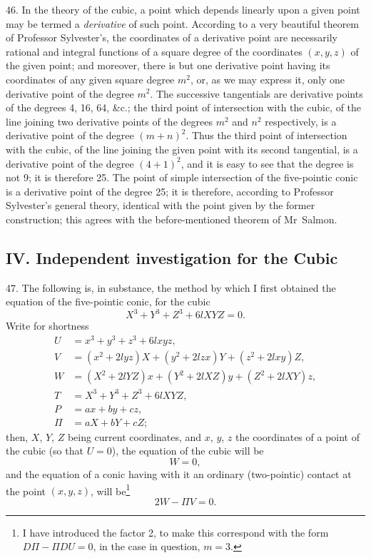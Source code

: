\documentclass[11pt,a4paper]{book}
\begin{document}
46. In the theory of the cubic, a point which depends linearly upon a given point may be termed a \textit{derivative} of such point. According to a very beautiful theorem of Professor Sylvester's, the coordinates of a derivative point are necessarily rational and integral functions of a square degree of the coordinates $(x,y,z)$ of the given point; and moreover, there is but one derivative point having its coordinates of any given square degree $m^2$, or, as we may express it, only one derivative point of the degree $m^2$. The successive tangentials are derivative points of the degrees 4, 16, 64, \&c.; the third point of intersection with the cubic, of the line joining two derivative points of the degrees $m^2$ and $n^2$ respectively, is a derivative point of the degree $(m+n)^2$. Thus the third point of intersection with the cubic, of the line joining the given point with its second tangential, is a derivative point of the degree $(4+1)^2$, and it is easy to see that the degree is not 9; it is therefore 25. The point of simple intersection of the five-pointic conic is a derivative point of the degree 25; it is therefore, according to Professor Sylvester's general theory, identical with the point given by the former construction; this agrees with the before-mentioned theorem of Mr~Salmon.

\subsection*{IV. Independent investigation for the Cubic}

47. The following is, in substance, the method by which I first obtained the equation of the five-pointic conic, for the cubic
\[
X^3+Y^3+Z^3+6lXYZ=0.
\]
Write for shortness
\begin{align*}
U &= x^3+y^3+z^3+6lxyz,\\
V &= (x^2+2lyz)X+(y^2+2lzx)Y+(z^2+2lxy)Z,\\
W &= (X^2+2lYZ)x+(Y^2+2lXZ)y+(Z^2+2lXY)z,\\
T &= X^3+Y^3+Z^3+6lXYZ,\\
P &= ax+by+cz,\\
\Pi &= aX+bY+cZ;
\end{align*}
then, $X$, $Y$, $Z$ being current coordinates, and $x$, $y$, $z$ the coordinates of a point of the cubic (so that $U=0$), the equation of the cubic will be
\[
W=0,
\]
and the equation of a conic having with it an ordinary (two-pointic) contact at the point $(x,y,z)$, will be\footnote{I have introduced the factor 2, to make this correspond with the form $D\Pi-\Pi DU=0$, in the case in question, $m=3$.}
\[
2W-\Pi V=0.
\]
\end{document}
